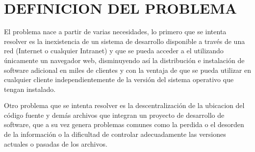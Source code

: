 \section{DEFINICION DEL PROBLEMA}

El problema nace a partir de varias necesidades, lo primero que se intenta resolver es la inexistencia de un sistema de desarrollo disponible a través de una red (Internet o cualquier Intranet) y que se pueda acceder a el utilizando únicamente un navegador web, disminuyendo así la distribución e instalación de software adicional en miles de clientes y con la ventaja de que se pueda utilizar en cualquier cliente independientemente de la versión del sistema operativo que tengan instalado.

Otro problema que se intenta resolver es la descentralización de la ubicacion del código fuente y demás archivos que integran un proyecto de desarrollo de software, que a su vez genera problemas comunes como la perdida o el desorden de la información o la dificultad de controlar adecuadamente las versiones actuales o pasadas de los archivos.
